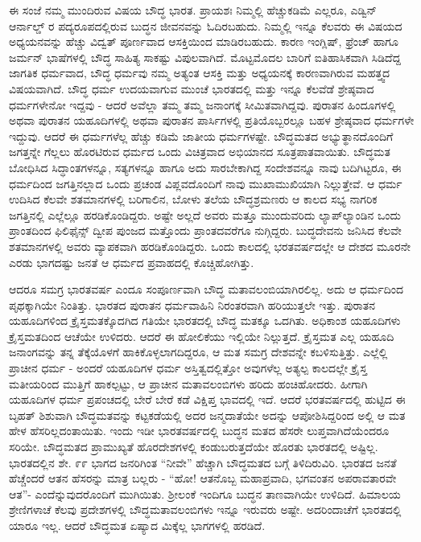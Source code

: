 ಈ ಸಂಜೆ ನಮ್ಮ ಮುಂದಿರುವ ವಿಷಯ ಬೌದ್ಧ ಭಾರತ. ಪ್ರಾಯಶಃ ನಿಮ್ಮಲ್ಲಿ ಹೆಚ್ಚುಕಡಿಮೆ ಎಲ್ಲರೂ, ಎಡ್ವಿನ್ ಆರ್ನಾಲ್ಡ್ ರ ಪದ್ಯರೂಪದಲ್ಲಿರುವ ಬುದ್ಧನ ಜೀವನವನ್ನು ಓದಿರಬಹುದು. ನಿಮ್ಮಲ್ಲಿ ಇನ್ನೂ ಕೆಲವರು ಈ ವಿಷಯದ ಅಧ್ಯಯನವನ್ನು ಹೆಚ್ಚು ವಿದ್ವತ್ ಪೂರ್ಣವಾದ ಆಸಕ್ತಿಯಿಂದ ಮಾಡಿರಬಹುದು. ಕಾರಣ ಇಂಗ್ಲಿಷ್, ಫ್ರೆಂಚ್ ಹಾಗೂ ಜರ್ಮನ್ ಭಾಷೆಗಳಲ್ಲಿ ಬೌದ್ಧ ಸಾಹಿತ್ಯ ಸಾಕಷ್ಟು ವಿಪುಲವಾಗಿದೆ. ಮೊಟ್ಟಮೊದಲ ಬಾರಿಗೆ ಐತಿಹಾಸಿಕವಾಗಿ ಸಿಡಿದೆದ್ದ ಜಾಗತಿಕ ಧರ್ಮವಾದ, ಬೌದ್ಧ ಧರ್ಮವು ನಮ್ಮ ಅತ್ಯಂತ ಆಸಕ್ತಿ ಮತ್ತು ಅಧ್ಯಯನಕ್ಕೆ ಕಾರಣವಾಗಿರುವ ಮಹತ್ತ್ವದ ವಿಷಯವಾಗಿದೆ. ಬೌದ್ಧ ಧರ್ಮ ಉದಯವಾಗುವ ಮುಂಚೆ ಭಾರತದಲ್ಲಿ ಮತ್ತು ಇನ್ನೂ ಕೆಲವೆಡೆ ಶ್ರೇಷ್ಠವಾದ ಧರ್ಮಗಳೇನೋ ಇದ್ದವು - ಆದರೆ ಅವೆಲ್ಲಾ ತಮ್ಮ ತಮ್ಮ ಜನಾಂಗಕ್ಕೆ ಸೀಮಿತವಾಗಿದ್ದವು. ಪುರಾತನ ಹಿಂದೂಗಳಲ್ಲಿ ಅಥವಾ ಪುರಾತನ ಯಹೂದಿಗಳಲ್ಲಿ ಅಥವಾ ಪುರಾತನ ಪಾರ್ಸಿಗಳಲ್ಲಿ ಪ್ರತಿಯೊಬ್ಬರಲ್ಲೂ ಬಹಳ ಶ್ರೇಷ್ಠವಾದ ಧರ್ಮಗಳೇ ಇದ್ದುವು. ಆದರೆ ಈ ಧರ್ಮಗಳೆಲ್ಲ ಹೆಚ್ಚು ಕಡಿಮೆ ಜಾತೀಯ ಧರ್ಮಗಳಷ್ಟೇ. ಬೌದ್ಧಮತದ ಅಭ್ಯುತ್ಥಾನದೊಂದಿಗೆ ಜಗತ್ತನ್ನೇ ಗೆಲ್ಲಲು ಹೊರಟಿರುವ ಧರ್ಮದ ಒಂದು ವಿಚಿತ್ರವಾದ ಅಭಿಯಾನದ ಸೂತ್ರಪಾತವಾಯಿತು. ಬೌದ್ಧಮತ ಬೋಧಿಸಿದ ಸಿದ್ಧಾಂತಗಳನ್ನೂ, ಸತ್ಯಗಳನ್ನೂ ಹಾಗೂ ಅದು ಸಾರಬೇಕಾಗಿದ್ದ ಸಂದೇಶವನ್ನೂ ನಾವು ಬದಿಗಿಟ್ಟರೂ, ಈ ಧರ್ಮದಿಂದ ಜಗತ್ತಿನಲ್ಲಾದ ಒಂದು ಪ್ರಚಂಡ ವಿಪ್ಲವದೊಂದಿಗೆ ನಾವು ಮುಖಾಮುಖಿಯಾಗಿ ನಿಲ್ಲುತ್ತೇವೆ. ಆ ಧರ್ಮ ಉದಿಸಿದ ಕೆಲವೇ ಶತಮಾನಗಳಲ್ಲಿ ಬರಿಗಾಲಿನ, ಬೋಳು ತಲೆಯ ಬೌದ್ಧಶ್ರಮಣರು ಆ ಕಾಲದ ಸಭ್ಯ ನಾಗರಿಕ ಜಗತ್ತಿನಲ್ಲಿ ಎಲ್ಲೆಲ್ಲೂ ಹರಡಿಕೊಂಡಿದ್ದರು. ಅಷ್ಟೇ ಅಲ್ಲದೆ ಅವರು ಮತ್ತೂ ಮುಂದುವರಿದು ಲ್ಯಾಪ್‌ಲ್ಯಾಂಡಿನ ಒಂದು ಪ್ರಾಂತದಿಂದ ಫಿಲಿಫೈನ್ಸ್ ದ್ವೀಪ ಪುಂಜದ ಮತ್ತೊಂದು ಪ್ರಾಂತದವರೆಗೂ ನುಗ್ಗಿದ್ದರು. ಬುದ್ಧದೇವನು ಜನಿಸಿದ ಕೆಲವೇ ಶತಮಾನಗಳಲ್ಲಿ ಅವರು ವ್ಯಾಪಕವಾಗಿ ಹರಡಿಕೊಂಡಿದ್ದರು. ಒಂದು ಕಾಲದಲ್ಲಿ ಭರತವರ್ಷದಲ್ಲೇ ಆ ದೇಶದ ಮೂರನೇ ಎರಡು ಭಾಗದಷ್ಟು ಜನತೆ ಆ ಧರ್ಮದ ಪ್ರವಾಹದಲ್ಲಿ ಕೊಚ್ಚಿಹೋಗಿತ್ತು.

ಆದರೂ ಸಮಗ್ರ ಭಾರತವರ್ಷ ಎಂದೂ ಸಂಪೂರ್ಣವಾಗಿ ಬೌದ್ಧ ಮತಾವಲಂಬಿಯಾಗಿರಲಿಲ್ಲ. ಅದು ಆ ಧರ್ಮದಿಂದ ಪೃಥಕ್ಕಾಗಿಯೇ ನಿಂತಿತ್ತು. ಭಾರತದ ಪುರಾತನ ಧರ್ಮವಾಹಿನಿ ನಿರಂತರವಾಗಿ ಹರಿಯುತ್ತಲೇ ಇತ್ತು. ಪುರಾತನ ಯಹೂದಿಗಳಿಂದ ಕ್ರೈಸ್ತಮತಕ್ಕೊದಗಿದ ಗತಿಯೇ ಭಾರತದಲ್ಲಿ ಬೌದ್ಧ ಮತಕ್ಕೂ ಒದಗಿತು. ಅಧಿಕಾಂಶ ಯಹೂದಿಗಳು ಕ್ರೈಸ್ತಮತದಿಂದ ಆಚೆಯೇ ಉಳಿದರು. ಆದರೆ ಈ ಹೋಲಿಕೆಯು ಇಲ್ಲಿಯೇ ನಿಲ್ಲುತ್ತದೆ. ಕ್ರೈಸ್ತಮತ ಎಲ್ಲ ಯಹೂದಿ ಜನಾಂಗವನ್ನು ತನ್ನ ತೆಕ್ಕೆಯೊಳಗೆ ಹಾಕಿಕೊಳ್ಳಲಾಗದಿದ್ದರೂ, ಆ ಮತ ಸಮಗ್ರ ದೇಶವನ್ನೇ ಕಬಳಿಸುತ್ತಿತ್ತು. ಎಲ್ಲೆಲ್ಲಿ ಪ್ರಾಚೀನ ಧರ್ಮ - ಅಂದರೆ ಯಹೂದಿಗಳ ಧರ್ಮ ಅಸ್ತಿತ್ವದಲ್ಲಿತ್ತೋ ಅವುಗಳೆಲ್ಲ ಅತ್ಯಲ್ಪ ಕಾಲದಲ್ಲೇ ಕ್ರೈಸ್ತ ಮತೀಯರಿಂದ ಮುತ್ತಿಗೆ ಹಾಕಲ್ಪಟ್ಟು, ಆ ಪ್ರಾಚೀನ ಮತಾವಲಂಬಿಗಳು ಹರಿದು ಹಂಚಿಹೋದರು. ಹೀಗಾಗಿ ಯಹೂದಿಗಳ ಧರ್ಮ ಪ್ರಪಂಚದಲ್ಲಿ ಬೇರೆ ಬೇರೆ ಕಡೆ ವಿಕ್ಷಿಪ್ತ ಭಾವದಲ್ಲಿ ಇದೆ. ಆದರೆ ಭರತವರ್ಷದಲ್ಲಿ ಹುಟ್ಟಿದ ಈ ಬೃಹತ್ ಶಿಶುವಾಗಿ ಬೌದ್ಧಮತವನ್ನು ಕಟ್ಟಕಡೆಯಲ್ಲಿ ಅದರ ಜನ್ಮದಾತೆಯೇ ಅದನ್ನು ಆಪೋಶಿಸಿದ್ದರಿಂದ ಅಲ್ಲಿ ಆ ಮತ ಹೇಳ ಹೆಸರಿಲ್ಲದಂತಾಯಿತು. ಇಂದು ಇಡೀ ಭಾರತವರ್ಷದಲ್ಲಿ ಬುದ್ಧನ ಮತದ ಹೆಸರೇ ಲುಪ್ತವಾಗಿದೆಯೆಂದರೂ ಸರಿಯೇ. ಬೌದ್ಧಮತದ ಪ್ರಾಮುಖ್ಯತೆ ಹೊರದೇಶಗಳಲ್ಲಿ ಕಂಡುಬರುತ್ತದೆಯೇ ಹೊರತು ಭಾರತದಲ್ಲಿ ಅಷ್ಟಿಲ್ಲ. ಭಾರತದಲ್ಲಿನ ಶೇ. ೯೯ ಭಾಗದ ಜನರಿಗಿಂತ “ನೀವೇ” ಹೆಚ್ಚಾಗಿ ಬೌದ್ಧಮತದ ಬಗ್ಗೆ ತಿಳಿದಿರುವಿರಿ. ಭಾರತದ ಜನತೆ ಹೆಚ್ಚೆಂದರೆ ಆತನ ಹೆಸರನ್ನು ಮಾತ್ರ ಬಲ್ಲರು - “ಹೋ! ಆತನೊಬ್ಬ ಮಹಾಪ್ರವಾದಿ, ಭಗವಂತನ ಅಪರಾವತಾರವೇ ಆತ”- ಎಂದೆನ್ನುವುದರೊಂದಿಗೆ ಮುಗಿಯಿತು. ಶ‍್ರೀಲಂಕೆ ಇಂದಿಗೂ ಬುದ್ಧನ ತಾಣವಾಗಿಯೇ ಉಳಿದಿದೆ. ಹಿಮಾಲಯ ಶ್ರೇಣಿಗಳಾಚೆ ಕೆಲವು ಪ್ರದೇಶಗಳಲ್ಲಿ ಬೌದ್ಧಮತಾವಲಂಬಿಗಳು ಇನ್ನೂ ಇರುವರು ಅಷ್ಟೇ. ಅದರಿಂದಾಚೆಗೆ ಭಾರತದಲ್ಲಿ ಯಾರೂ ಇಲ್ಲ. ಆದರೆ ಬೌದ್ಧಮತ ಏಷ್ಯಾದ ಮಿಕ್ಕೆಲ್ಲ ಭಾಗಗಳಲ್ಲಿ ಹರಡಿದೆ.

